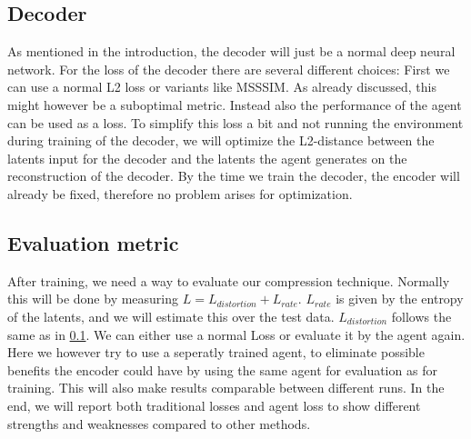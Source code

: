 \documentclass[a4paper]{scrartcl}
\begin{document}
    \subsection{Decoder}\label{methods:Decoder}
        As mentioned in the introduction, the decoder will just be a normal deep
        neural network. For the loss of the decoder there are several different
        choices: First we can use a normal L2 loss or variants like MSSSIM. As
        already discussed, this might however be a suboptimal metric. Instead
        also the performance of the agent can be used as a loss. To simplify
        this loss a bit and not running the environment during training of the
        decoder, we will optimize the L2-distance between the latents input for
        the decoder and the latents the agent generates on the reconstruction of
        the decoder. By the time we train the decoder, the encoder will already
        be fixed, therefore no problem arises for optimization.

    \subsection{Evaluation metric}
        After training, we need a way to evaluate our compression technique.
        Normally this will be done by measuring $L = L_{distortion} + L_{rate}$.
        $L_{rate}$ is given by the entropy of the latents, and we will estimate this over
        the test data. $L_{distortion}$ follows the same as in
        \ref{methods:Decoder}. We can either use a normal Loss or evaluate it by
        the agent again. Here we however try to use a seperatly trained agent,
        to eliminate possible benefits the encoder could have by using the same
        agent for evaluation as for training. This will also make results
        comparable between different runs. In the end, we will report both traditional
        losses and agent loss to show different strengths and weaknesses
        compared to other methods. 
        
\end{document}
